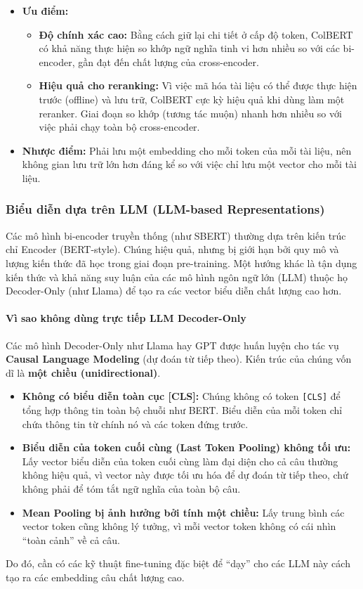 \begin{itemize}
	\item \textbf{Ưu điểm:}
	\begin{itemize}
		\item \textbf{Độ chính xác cao:} Bằng cách giữ lại chi tiết ở cấp độ token, ColBERT có khả năng thực hiện so khớp ngữ nghĩa tinh vi hơn nhiều so với các bi-encoder, gần đạt đến chất lượng của cross-encoder.
		\item \textbf{Hiệu quả cho reranking:} Vì việc mã hóa tài liệu có thể được thực hiện trước (offline) và lưu trữ, ColBERT cực kỳ hiệu quả khi dùng làm một reranker. Giai đoạn so khớp (tương tác muộn) nhanh hơn nhiều so với việc phải chạy toàn bộ cross-encoder.
	\end{itemize}

	\item \textbf{Nhược điểm:} Phải lưu một embedding cho mỗi token của mỗi tài liệu, nên không gian lưu trữ lớn hơn đáng kể so với việc chỉ lưu một vector cho mỗi tài liệu.
\end{itemize}

\subsubsection{Biểu diễn dựa trên LLM (LLM-based Representations)}
\label{sssec:llm_based_embeddings}
Các mô hình bi-encoder truyền thống (như SBERT) thường dựa trên kiến trúc chỉ Encoder (BERT-style). Chúng hiệu quả, nhưng bị giới hạn bởi quy mô và lượng kiến thức đã học trong giai đoạn pre-training. Một hướng khác là tận dụng kiến thức và khả năng suy luận của các mô hình ngôn ngữ lớn (LLM) thuộc họ Decoder-Only (như Llama) để tạo ra các vector biểu diễn chất lượng cao hơn.

\paragraph{Vì sao không dùng trực tiếp LLM Decoder-Only}
Các mô hình Decoder-Only như Llama hay GPT được huấn luyện cho tác vụ \textbf{Causal Language Modeling} (dự đoán từ tiếp theo). Kiến trúc của chúng vốn dĩ là \textbf{một chiều (unidirectional)}.
\begin{itemize}
	\item \textbf{Không có biểu diễn toàn cục [CLS]:} Chúng không có token \texttt{[CLS]} để tổng hợp thông tin toàn bộ chuỗi như BERT. Biểu diễn của mỗi token chỉ chứa thông tin từ chính nó và các token đứng trước.
	\item \textbf{Biểu diễn của token cuối cùng (Last Token Pooling) không tối ưu:} Lấy vector biểu diễn của token cuối cùng làm đại diện cho cả câu thường không hiệu quả, vì vector này được tối ưu hóa để dự đoán từ tiếp theo, chứ không phải để tóm tắt ngữ nghĩa của toàn bộ câu.
	\item \textbf{Mean Pooling bị ảnh hưởng bởi tính một chiều:} Lấy trung bình các vector token cũng không lý tưởng, vì mỗi vector token không có cái nhìn “toàn cảnh” về cả câu.
\end{itemize}
Do đó, cần có các kỹ thuật fine-tuning đặc biệt để “dạy” cho các LLM này cách tạo ra các embedding câu chất lượng cao.

